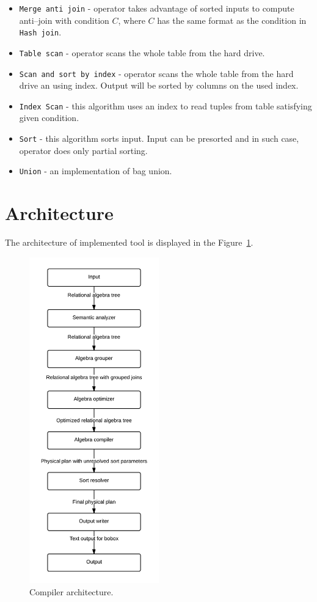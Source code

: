 \begin{itemize}
\item \texttt{Merge~anti~join} - operator takes advantage of sorted inputs to compute anti--join with condition $C$, where $C$ has the same format as the condition in \texttt{Hash~join}. 
\item \texttt{Table~scan} - operator scans the whole table from the hard drive.
\item \texttt{Scan~and~sort~by~index} - operator scans the whole table from the hard drive an using index. Output will be sorted by columns on the used index.
\item \texttt{Index~Scan} - this algorithm uses an index to read tuples from table satisfying given condition.
\item \texttt{Sort} - this algorithm sorts input. Input can be presorted and in such case, operator does only partial sorting.
\item \texttt{Union} - an implementation of bag union.

\end{itemize}


\section{Architecture}
The architecture of implemented tool is displayed in the Figure~\ref{fig:compilerarchitecture}.

\begin{figure}[h!]
  \centering
    \includegraphics[width=0.5\textwidth]{compilerarchitecture}

      \caption{Compiler architecture.}
          \label{fig:compilerarchitecture}
\end{figure}

